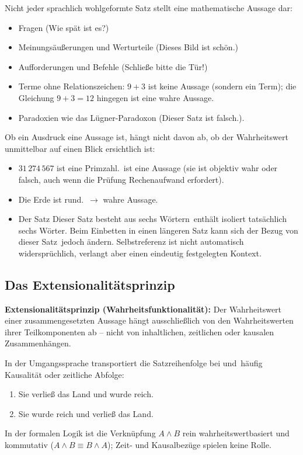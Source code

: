 \begin{bemerkung}
Nicht jeder sprachlich wohlgeformte Satz stellt eine mathematische Aussage dar:
\begin{itemize}
    \item Fragen (\glqq Wie spät ist es?\grqq)
    \item Meinungsäußerungen und Werturteile (\glqq Dieses Bild ist schön.\grqq)
    \item Aufforderungen und Befehle (\glqq Schließe bitte die Tür!\grqq)
    \item Terme ohne Relationszeichen: $9 + 3$ ist keine Aussage (sondern ein Term); die Gleichung $9 + 3 = 12$ hingegen ist eine wahre Aussage.
    \item Paradoxien wie das Lügner-Paradoxon (\glqq Dieser Satz ist falsch.\grqq).
\end{itemize}
\end{bemerkung}

\begin{beispiel}
Ob ein Ausdruck eine Aussage ist, hängt nicht davon ab, ob der Wahrheitswert unmittelbar auf einen Blick ersichtlich ist:
\begin{itemize}
    \item \glqq $31\,274\,567$ ist eine Primzahl.\grqq\ ist eine Aussage (sie ist objektiv wahr oder falsch, auch wenn die Prüfung Rechenaufwand erfordert).
    \item \glqq Die Erde ist rund.\grqq\ $\rightarrow$ wahre Aussage.
    \item Der Satz \glqq Dieser Satz besteht aus sechs Wörtern\grqq\ enthält isoliert tatsächlich sechs Wörter. Beim Einbetten in einen längeren Satz kann sich der Bezug von \glqq dieser Satz\grqq\ jedoch ändern. Selbstreferenz ist nicht automatisch widersprüchlich, verlangt aber einen eindeutig festgelegten Kontext.
\end{itemize}
\end{beispiel}

\subsection*{Das Extensionalitätsprinzip}
\textbf{Extensionalitätsprinzip (Wahrheitsfunktionalität):} Der Wahrheitswert einer zusammengesetzten Aussage hängt ausschließlich von den Wahrheitswerten ihrer Teilkomponenten ab -- nicht von inhaltlichen, zeitlichen oder kausalen Zusammenhängen.

\begin{bemerkung}
In der Umgangssprache transportiert die Satzreihenfolge bei \glqq und\grqq\ häufig Kausalität oder zeitliche Abfolge:
\begin{enumerate}
    \item \glqq Sie verließ das Land und wurde reich.\grqq
    \item \glqq Sie wurde reich und verließ das Land.\grqq
\end{enumerate}
In der formalen Logik ist die Verknüpfung $A \land B$ rein wahrheitswertbasiert und kommutativ ($A \land B \equiv B \land A$); Zeit- und Kausalbezüge spielen keine Rolle.
\end{bemerkung}


